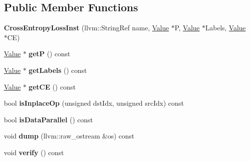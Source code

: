 \subsection*{Public Member Functions}
\begin{DoxyCompactItemize}
\item 
\mbox{\label{classglow_1_1_cross_entropy_loss_inst_a76813406e90f3dddc0e2cf6750d9b244}} 
{\bfseries Cross\+Entropy\+Loss\+Inst} (llvm\+::\+String\+Ref name, \hyperlink{classglow_1_1_value}{Value} $\ast$P, \hyperlink{classglow_1_1_value}{Value} $\ast$Labels, \hyperlink{classglow_1_1_value}{Value} $\ast$CE)
\item 
\mbox{\label{classglow_1_1_cross_entropy_loss_inst_aae4adc67c90cfb4fcf53319c41d67cd6}} 
\hyperlink{classglow_1_1_value}{Value} $\ast$ {\bfseries getP} () const
\item 
\mbox{\label{classglow_1_1_cross_entropy_loss_inst_a6fc68bf0201dfdc84bd3f21083feda4a}} 
\hyperlink{classglow_1_1_value}{Value} $\ast$ {\bfseries get\+Labels} () const
\item 
\mbox{\label{classglow_1_1_cross_entropy_loss_inst_aaf2d89b9a56a35e6071fcaeefbbe9560}} 
\hyperlink{classglow_1_1_value}{Value} $\ast$ {\bfseries get\+CE} () const
\item 
\mbox{\label{classglow_1_1_cross_entropy_loss_inst_a44ff79e5f292f4079f53f9b02ff68fb0}} 
bool {\bfseries is\+Inplace\+Op} (unsigned dst\+Idx, unsigned src\+Idx) const
\item 
\mbox{\label{classglow_1_1_cross_entropy_loss_inst_a214c401dade33bc328be8b68b6a41123}} 
bool {\bfseries is\+Data\+Parallel} () const
\item 
\mbox{\label{classglow_1_1_cross_entropy_loss_inst_ae58088d3a7d24ef2c4996ec70b7fc0e0}} 
void {\bfseries dump} (llvm\+::raw\+\_\+ostream \&os) const
\item 
\mbox{\label{classglow_1_1_cross_entropy_loss_inst_a49d243bd8c5ac184267ebb695a9c1fab}} 
void {\bfseries verify} () const
\end{DoxyCompactItemize}
